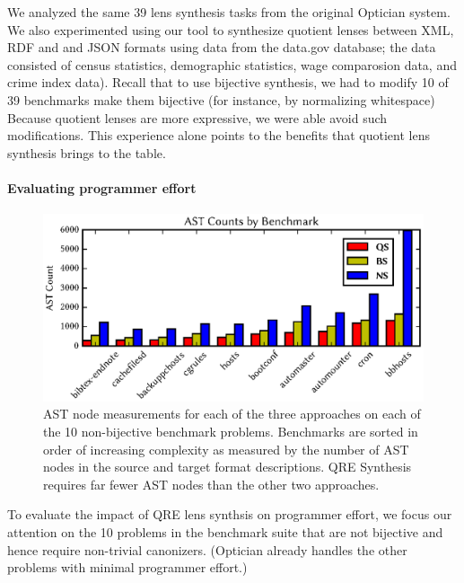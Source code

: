 \documentclass[12pt]{article}
\begin{document}
{We analyzed the same 39 lens synthesis tasks from the original
Optician system.
We also experimented using our tool to synthesize quotient lenses
between XML, RDF and and JSON formats using data from the data.gov
database; the data consisted of census statistics, demographic
statistics, wage comparosion data, and crime index data).
Recall that to use bijective synthesis,  we had to modify 10 of 39
benchmarks make them bijective (for instance, by normalizing whitespace)
Because quotient lenses are more expressive, we were able avoid such
modifications. This
experience alone points to the benefits that quotient lens synthesis
brings to the table. 

\paragraph*{Evaluating programmer effort}

\begin{figure}[t]
\centering
\includegraphics{qfigs/asts.eps}
\caption{AST node measurements for each of the three approaches
on each of the 10 non-bijective benchmark problems.
Benchmarks are sorted in order of increasing complexity as measured by
the number of AST nodes in the source and target format descriptions. 
QRE Synthesis requires far fewer AST nodes than the other
two approaches.}
\label{fig:asts}
\end{figure}

To evaluate the impact of QRE lens synthsis on programmer effort,
we focus our attention on the 10 problems in the benchmark suite that
are not bijective and hence require non-trivial canonizers. 
(Optician already handles the other problems with minimal programmer
effort.)

}
\end{document}
